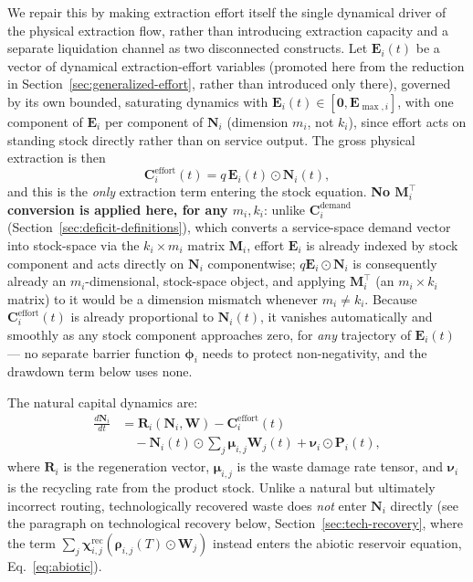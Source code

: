 \documentclass[twocolumn,10pt]{article}
\begin{document}
We repair this by making extraction effort itself the single dynamical driver of the physical extraction flow, rather than introducing extraction capacity and a separate liquidation channel as two disconnected constructs. Let $\mathbf E_i(t)$ be a vector of dynamical extraction-effort variables (promoted here from the reduction in Section~\ref{sec:generalized-effort}, rather than introduced only there), governed by its own bounded, saturating dynamics with $\mathbf E_i(t)\in[\mathbf 0,\mathbf E_{\max,i}]$, with one component of $\mathbf E_i$ per component of $\mathbf N_i$ (dimension $m_i$, not $k_i$), since effort acts on standing stock directly rather than on service output. The gross physical extraction is then
\[
\mathbf{C}_i^{\text{effort}}(t) = q\,\mathbf{E}_i(t)\odot\mathbf{N}_i(t),
\]
and this is the \emph{only} extraction term entering the stock equation. \textbf{No $\mathbf M_i^\top$ conversion is applied here, for any $m_i,k_i$}: unlike $\mathbf C_i^{\text{demand}}$ (Section~\ref{sec:deficit-definitions}), which converts a service-space demand vector into stock-space via the $k_i\times m_i$ matrix $\mathbf M_i$, effort $\mathbf E_i$ is already indexed by stock component and acts directly on $\mathbf N_i$ componentwise; $q\mathbf E_i\odot\mathbf N_i$ is consequently already an $m_i$-dimensional, stock-space object, and applying $\mathbf M_i^\top$ (an $m_i\times k_i$ matrix) to it would be a dimension mismatch whenever $m_i\neq k_i$. Because $\mathbf C_i^{\text{effort}}(t)$ is already proportional to $\mathbf N_i(t)$, it vanishes automatically and smoothly as any stock component approaches zero, for \emph{any} trajectory of $\mathbf E_i(t)$ — no separate barrier function $\boldsymbol\phi_i$ needs to protect non-negativity, and the drawdown term below uses none.

The natural capital dynamics are:
\begin{align}
\frac{d\mathbf{N}_i}{dt} &= \mathbf{R}_i(\mathbf{N}_i,\mathbf{W})
   - \mathbf{C}_i^{\text{effort}}(t) \nonumber\\
   &\quad - \mathbf{N}_i(t) \odot \sum_j \boldsymbol{\mu}_{i,j} \mathbf{W}_j(t)
   + \boldsymbol{\nu}_i \odot \mathbf{P}_i(t),
\label{eq:nvec-corrected}
\end{align}
where \(\mathbf{R}_i\) is the regeneration vector, \(\boldsymbol{\mu}_{i,j}\) is the waste damage rate tensor, and \(\boldsymbol{\nu}_i\) is the recycling rate from the product stock. Unlike a natural but ultimately incorrect routing, technologically recovered waste does \emph{not} enter $\mathbf N_i$ directly (see the paragraph on technological recovery below, Section~\ref{sec:tech-recovery}, where the term $\sum_j\boldsymbol\chi^{\text{rec}}_{i,j}(\boldsymbol\rho_{i,j}(T)\odot\mathbf W_j)$ instead enters the abiotic reservoir equation, Eq.~\eqref{eq:abiotic}).
\end{document}
